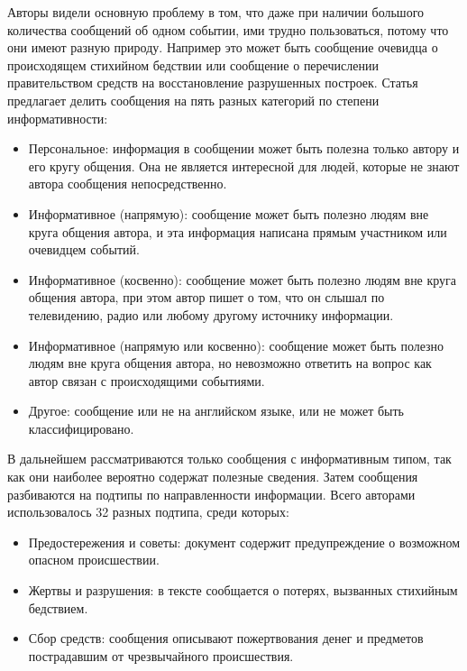 \documentclass[12pt, a4paper]{article}
\begin{document}
	Авторы видели основную проблему в том, что даже при наличии большого количества сообщений об одном событии, ими трудно пользоваться, потому что они имеют разную природу. Например это может быть сообщение очевидца о происходящем стихийном бедствии или сообщение о перечислении правительством средств на восстановление разрушенных построек. Статья предлагает делить сообщения на пять разных категорий по степени информативности:
	\begin{itemize}
	\item Персональное:
	информация в сообщении может быть полезна только автору и его кругу общения. Она не является интересной для людей, которые не знают автора сообщения непосредственно.
	\item Информативное (напрямую):
	сообщение может быть полезно людям вне круга общения автора, и эта информация написана прямым участником или очевидцем событий.
	\item Информативное (косвенно):
	сообщение может быть полезно людям вне круга общения автора, при этом автор пишет о том, что он слышал по телевидению, радио или любому другому источнику информации.
	\item Информативное (напрямую или косвенно):
	сообщение может быть полезно людям вне круга общения автора, но невозможно ответить на вопрос как автор связан с происходящими событиями.
	\item Другое:
	сообщение или не на английском языке, или не может быть классифицировано.
	\end{itemize}
	
	В дальнейшем рассматриваются только сообщения с информативным типом, так как они наиболее вероятно содержат полезные сведения. Затем сообщения разбиваются на подтипы по направленности информации. Всего авторами использовалось 32 разных подтипа, среди которых:
	\begin{itemize}
	\item Предостережения и советы: документ содержит предупреждение о возможном опасном происшествии.
	\item Жертвы и разрушения: в тексте сообщается о потерях, вызванных стихийным бедствием.
	\item Сбор средств: сообщения описывают пожертвования денег и предметов пострадавшим от чрезвычайного происшествия.
	\end{itemize}
	
\end{document}
